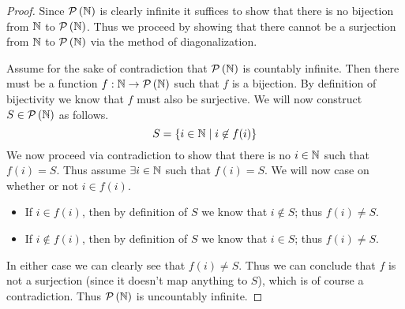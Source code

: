         \begin{proof}
            Since $\mathcal{P}\left(\mathbb{N}\right)$ is clearly infinite it suffices to show that there is
            no bijection from $\mathbb{N}$ to $\mathcal{P}\left(\mathbb{N}\right)$. Thus we proceed by showing
            that there cannot be a surjection from $\mathbb{N}$ to $\mathcal{P}\left(\mathbb{N}\right)$ via the
            method of diagonalization.

            Assume for the sake of contradiction that $\mathcal{P}\left(\mathbb{N}\right)$ is countably infinite.
            Then there must be a function $f : \mathbb{N} \rightarrow \mathcal{P}\left(\mathbb{N}\right)$ such that
            $f$ is a bijection. By definition of bijectivity we know that $f$ must also be surjective.
            We will now construct $S \in \mathcal{P}\left(\mathbb{N}\right)$ as follows.
            \[
                S = \left\{i \in \mathbb{N} \mid i \not\in f(i)\right\}
            \]
            We now proceed via contradiction to show that there is no $i \in \mathbb{N}$ such
            that $f(i) = S$.
            Thus assume $\exists i \in \mathbb{N}$ such that $f(i) = S$. We will now case on whether
            or not $i \in f(i)$.
            \begin{itemize}
                \item
                    If $i \in f(i)$, then by definition of $S$ we know that $i \not\in S$; thus $f(i) \neq S$.
                \item
                    If $i \not\in f(i)$, then by definition of $S$ we know that $i \in S$; thus $f(i) \neq S$.
            \end{itemize}
            In either case we can clearly see that $f(i) \neq S$. Thus we can conclude that
            $f$ is not a surjection (since it doesn't map anything to $S$), which is of course 
            a contradiction. Thus $\mathcal{P}\left(\mathbb{N}\right)$ is uncountably infinite. \QED



\end{proof}
